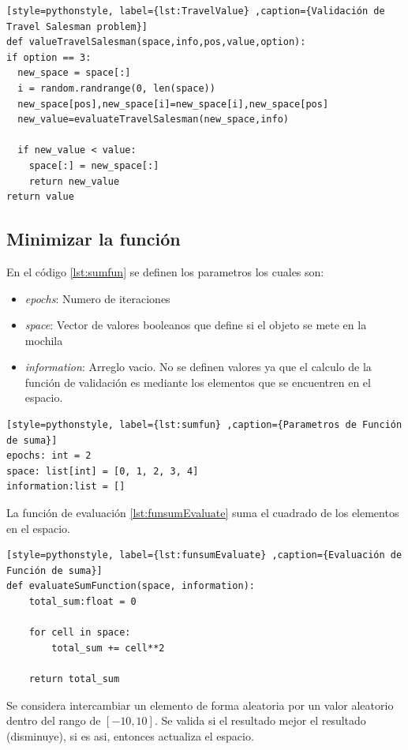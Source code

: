 \documentclass[12pt,twoside]{article}
\begin{document}
\begin{lstlisting}[style=pythonstyle, label={lst:TravelValue} ,caption={Validación de Travel Salesman problem}]
def valueTravelSalesman(space,info,pos,value,option):
if option == 3:
  new_space = space[:]
  i = random.randrange(0, len(space))
  new_space[pos],new_space[i]=new_space[i],new_space[pos]
  new_value=evaluateTravelSalesman(new_space,info)

  if new_value < value: 
    space[:] = new_space[:]
    return new_value
return value
\end{lstlisting}

\clearpage
\subsection{Minimizar la función}

En el código \ref{lst:sumfun} se definen los parametros los cuales son:
\begin{itemize}
	\item \textit{epochs}: Numero de iteraciones
	\item \textit{space}: Vector de valores booleanos que define si el objeto se mete en la mochila
	\item \textit{information}: Arreglo vacio. No se definen valores ya que el calculo de la función de validación es mediante los elementos que se encuentren en el espacio.
\end{itemize}

\begin{lstlisting}[style=pythonstyle, label={lst:sumfun} ,caption={Parametros de Función de suma}]
epochs: int = 2
space: list[int] = [0, 1, 2, 3, 4]
information:list = []
\end{lstlisting}

La función de evaluación \ref{lst:funsumEvaluate} suma el cuadrado de los elementos en el  espacio. 

\begin{lstlisting}[style=pythonstyle, label={lst:funsumEvaluate} ,caption={Evaluación de Función de suma}]
def evaluateSumFunction(space, information):
	total_sum:float = 0
	
	for cell in space:
		total_sum += cell**2
	
	return total_sum\end{lstlisting}

Se considera intercambiar un elemento de forma aleatoria por un valor aleatorio dentro del rango de $[-10, 10]$. Se valida si el resultado mejor el resultado (disminuye), si es asi, entonces actualiza el espacio.
\end{document}

